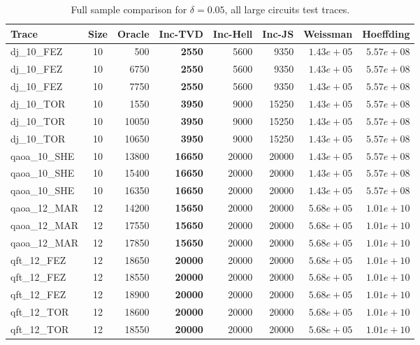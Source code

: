 \clearpage
\begin{table}[ht!]
\centering
\footnotesize
\setlength{\tabcolsep}{3pt}
\renewcommand{\arraystretch}{1.05}
\caption{Full sample comparison for $\delta = 0.05$, all large circuits test traces.}
\label{tab:appendix-sota-d005-l}
\begin{tabular}{l c r r r r r r}
\toprule
Trace & Size & Oracle & Inc-TVD & Inc-Hell & Inc-JS & Weissman & Hoeffding \\
\midrule
dj\_10\_FEZ & 10 & 500 & \textbf{2550} & 5600 & 9350 & $1.43e+05$ & $5.57e+08$ \\
dj\_10\_FEZ & 10 & 6750 & \textbf{2550} & 5600 & 9350 & $1.43e+05$ & $5.57e+08$ \\
dj\_10\_FEZ & 10 & 7750 & \textbf{2550} & 5600 & 9350 & $1.43e+05$ & $5.57e+08$ \\
dj\_10\_TOR & 10 & 1550 & \textbf{3950} & 9000 & 15250 & $1.43e+05$ & $5.57e+08$ \\
dj\_10\_TOR & 10 & 10050 & \textbf{3950} & 9000 & 15250 & $1.43e+05$ & $5.57e+08$ \\
dj\_10\_TOR & 10 & 10650 & \textbf{3950} & 9000 & 15250 & $1.43e+05$ & $5.57e+08$ \\
qaoa\_10\_SHE & 10 & 13800 & \textbf{16650} & 20000 & 20000 & $1.43e+05$ & $5.57e+08$ \\
qaoa\_10\_SHE & 10 & 15400 & \textbf{16650} & 20000 & 20000 & $1.43e+05$ & $5.57e+08$ \\
qaoa\_10\_SHE & 10 & 16350 & \textbf{16650} & 20000 & 20000 & $1.43e+05$ & $5.57e+08$ \\
qaoa\_12\_MAR & 12 & 14200 & \textbf{15650} & 20000 & 20000 & $5.68e+05$ & $1.01e+10$ \\
qaoa\_12\_MAR & 12 & 17550 & \textbf{15650} & 20000 & 20000 & $5.68e+05$ & $1.01e+10$ \\
qaoa\_12\_MAR & 12 & 17850 & \textbf{15650} & 20000 & 20000 & $5.68e+05$ & $1.01e+10$ \\
qft\_12\_FEZ & 12 & 18650 & \textbf{20000} & 20000 & 20000 & $5.68e+05$ & $1.01e+10$ \\
qft\_12\_FEZ & 12 & 18550 & \textbf{20000} & 20000 & 20000 & $5.68e+05$ & $1.01e+10$ \\
qft\_12\_FEZ & 12 & 18900 & \textbf{20000} & 20000 & 20000 & $5.68e+05$ & $1.01e+10$ \\
qft\_12\_TOR & 12 & 18600 & \textbf{20000} & 20000 & 20000 & $5.68e+05$ & $1.01e+10$ \\
qft\_12\_TOR & 12 & 18550 & \textbf{20000} & 20000 & 20000 & $5.68e+05$ & $1.01e+10$ \\

\end{tabular}
\end{table}
